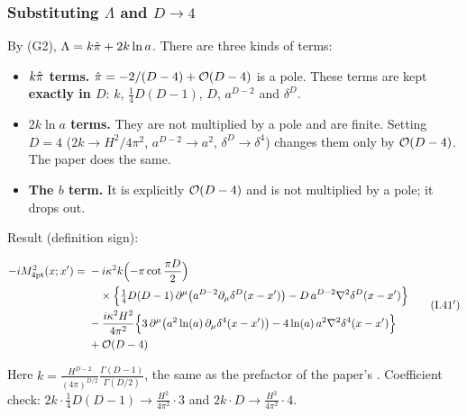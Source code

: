 \subsubsection{Substituting \texorpdfstring{$\Lambda$}{Lambda} and \texorpdfstring{$D\to4$}{D->4} \texorpdfstring{\tA}{}}
By (G2), \(\Lambda=k\hat\pi+2k\ln a\). There are three kinds of terms:
\begin{itemize}
\item \textbf{\(k\hat\pi\) terms.} \(\hat\pi=-2/(D-4)+\mathcal{O}\!\left(D-4\right)\) is a pole. These terms are kept
\textbf{exactly in \(D\)}: \(k\), \(\tfrac14D(D-1)\), \(D\), \(a^{D-2}\) and \(\delta^D\).
\item \textbf{\(2k\ln a\) terms.} They are not multiplied by a pole and are finite. Setting
\(D=4\) (\(2k\to H^2/4\pi^2\), \(a^{D-2}\to a^2\), \(\delta^D\to\delta^4\)) changes them only by
\(\mathcal{O}\!\left(D-4\right)\). The paper does the same.
\item \textbf{The \(b\) term.} It is explicitly \(\mathcal{O}\!\left(D-4\right)\) and is not multiplied by a pole;
it drops out.
\end{itemize}
Result (definition sign):
\begin{resultbox}
\begin{equation*}\label{eq:t5-I41}
\begin{aligned}
-iM^2_{\rm 4pt}(x;x')={}&-i\kappa^2k\Bigl(-\pi\cot\frac{\pi D}{2}\Bigr)\\
&\quad\times\Bigl\{\tfrac14D(D-1)\,\partial^\mu\bigl(a^{D-2}\partial_\mu\delta^D(x-x')\bigr)-D\,a^{D-2}\nabla^2\delta^D(x-x')\Bigr\}\\
&-\frac{i\kappa^2H^2}{4\pi^2}\Bigl\{3\,\partial^\mu\bigl(a^2\ln(a)\,\partial_\mu\delta^4(x-x')\bigr)-4\ln(a)\,a^2\nabla^2\delta^4(x-x')\Bigr\}\\
&+\mathcal{O}\!\left(D-4\right)
\end{aligned}
\tag{I.41$'$}
\end{equation*}
\end{resultbox}
Here \(k=\frac{H^{D-2}}{(4\pi)^{D/2}}\frac{\Gamma(D-1)}{\Gamma(D/2)}\), the same as the prefactor of the
paper's . Coefficient check: \(2k\cdot\tfrac14D(D-1)\to\tfrac{H^2}{4\pi^2}\cdot3\) and
\(2k\cdot D\to\tfrac{H^2}{4\pi^2}\cdot4\).

